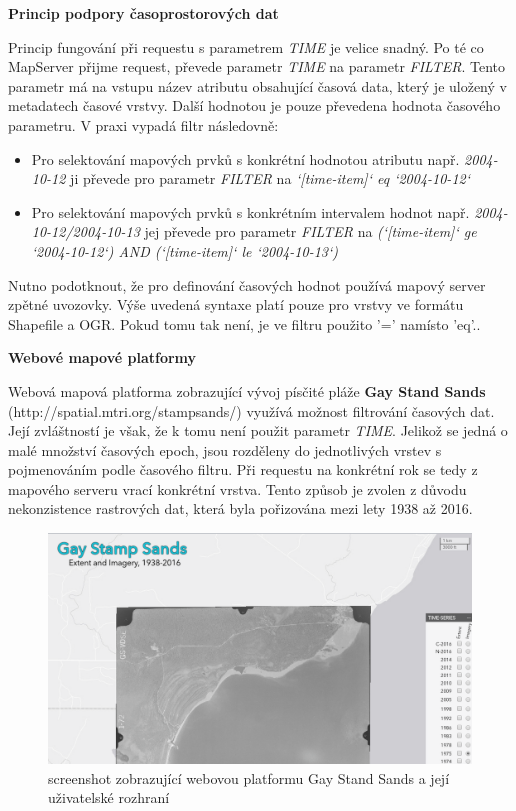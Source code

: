 \bigskip
\noindent
\textbf{Princip podpory časoprostorových dat}

Princip fungování při requestu s parametrem \textit{TIME} je velice
snadný. Po té co MapServer přijme request, převede parametr
\textit{TIME} na parametr \textit{FILTER}. Tento parametr má na vstupu
název atributu obsahující časová data, který je uložený v metadatech
časové vrstvy\cite{mapserver_about}. Další hodnotou je pouze převedena
hodnota časového parametru. V praxi vypadá filtr následovně:

\bigskip
\begin{itemize}
	\item Pro selektování mapových prvků s konkrétní hodnotou
atributu např. \textit{2004-10-12} ji převede pro parametr
\textit{FILTER} na \textit{`[time-item]` eq `2004-10-12`}
	\item Pro selektování mapových prvků s konkrétním intervalem
hodnot např. \textit{2004-10-12/2004-10-13} jej převede pro parametr
\textit{FILTER} na \textit{(`[time-item]` ge `2004-10-12`) AND
(`[time-item]` le `2004-10-13`)}
\end{itemize}

\bigskip Nutno podotknout, že pro definování časových hodnot používá
mapový server zpětné uvozovky. Výše uvedená syntaxe platí pouze pro
vrstvy ve formátu Shapefile a OGR. Pokud tomu tak není, je ve filtru
použito '=' namísto 'eq'.\cite{mapserver_about}.

\bigskip
\noindent \textbf{Webové mapové platformy}

Webová mapová platforma zobrazující vývoj písčité pláže \textbf{Gay
Stand Sands} (http://spatial.mtri.org/stampsands/) využívá možnost
filtrování časových dat. Její zvláštností je však, že k tomu není
použit parametr \textit{TIME}. Jelikož se jedná o malé množství
časových epoch, jsou rozděleny do jednotlivých vrstev s pojmenováním
podle časového filtru. Při requestu na konkrétní rok se tedy z
mapového serveru vrací konkrétní vrstva. Tento způsob je zvolen z
důvodu nekonzistence rastrových dat, která byla pořizována mezi lety
1938 až 2016.

\begin{figure}[h!]  \centering
\includegraphics[width=1\textwidth]{../img/gay-sands.png}
	\caption{screenshot zobrazující webovou platformu Gay Stand
Sands a její uživatelské rozhraní}
	\label{fig:gay-sands}
\end{figure}

